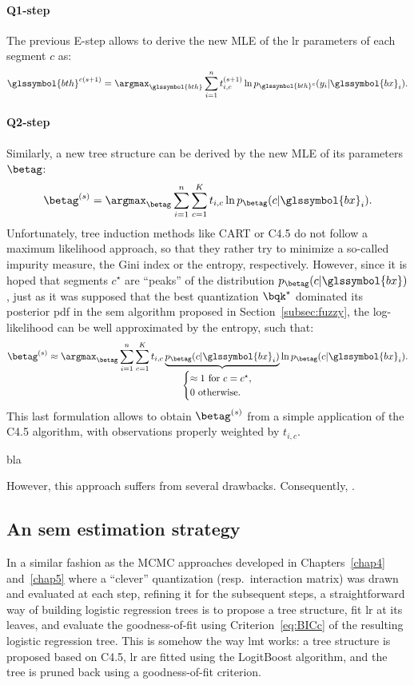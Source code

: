 \paragraph{Q1-step}
The previous E-step allows to derive the new MLE of the \gls{lr} parameters of each segment $c$ as:
\[ \glssymbol{bth}^{c(s+1)} = \argmax_{\glssymbol{bth}} \sum_{i=1}^n t_{i,c}^{(s+1)} \ln p_{\glssymbol{bth}^c}(y_i | \glssymbol{bx}_i). \]

\paragraph{Q2-step}
Similarly, a new tree structure can be derived by the new MLE of its parameters $\betag$:
\[ \betag^{(s)} = \argmax_{\betag} \sum_{i=1}^n \sum_{c=1}^K t_{i,c} \ln p_{\betag}( c | \glssymbol{bx}_i). \]
Unfortunately, tree induction methods like CART or C4.5 do not follow a maximum likelihood approach, so that they rather try to minimize a so-called impurity measure, the Gini index or the entropy, respectively. However, since it is hoped that segments $c^\star$ are ``peaks'' of the distribution $p_{\betag}( c | \glssymbol{bx})$, just as it was supposed that the best quantization $\bqk^\star$ dominated its posterior \gls{pdf} in the \gls{sem} algorithm proposed in Section~\ref{subsec:fuzzy}, the log-likelihood can be well approximated by the entropy, such that:
\[ \betag^{(s)} \approx \argmax_{\betag} \sum_{i=1}^n \sum_{c=1}^K t_{i,c} \underbrace{p_{\betag}( c | \glssymbol{bx}_i)}_{\begin{cases} \approx 1 \text{ for } c = c^\star, \\ 0 \text{ otherwise.} \end{cases}} \ln p_{\betag}( c | \glssymbol{bx}_i). \]
This last formulation allows to obtain $\betag^{(s)}$ from a simple application of the C4.5 algorithm, with observations properly weighted by $t_{i,c}$.

bla

However, this approach suffers from several drawbacks. 
Consequently, .

\subsection{An \gls{sem} estimation strategy}

In a similar fashion as the MCMC approaches developed in Chapters~\ref{chap4} and~\ref{chap5} where a ``clever'' quantization (resp.\ interaction matrix) was drawn and evaluated at each step, refining it for the subsequent steps, a straightforward way of building logistic regression trees is to propose a tree structure, fit \gls{lr} at its leaves, and evaluate the goodness-of-fit using Criterion~\ref{eq:BICc} of the resulting logistic regression tree. This is somehow the way \gls{lmt} works: a tree structure is proposed based on C4.5, \gls{lr} are fitted using the LogitBoost algorithm, and the tree is pruned back using a goodness-of-fit criterion.

